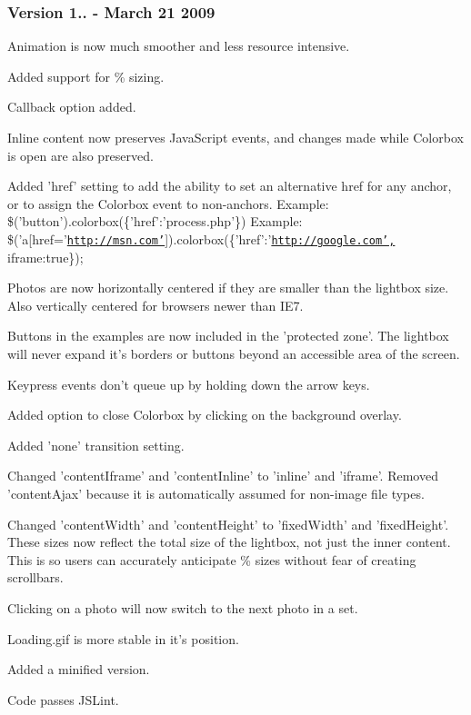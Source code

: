 \subsubsection*{Version 1.. -\/ March 21 2009}


\begin{DoxyItemize}
\item Animation is now much smoother and less resource intensive.
\item Added support for \% sizing.
\item Callback option added.
\item Inline content now preserves Java\-Script events, and changes made while Colorbox is open are also preserved.
\item Added 'href' setting to add the ability to set an alternative href for any anchor, or to assign the Colorbox event to non-\/anchors. Example\-: \$('button').colorbox(\{'href'\-:'process.\-php'\}) Example\-: \$('a\mbox{[}href='\href{http://msn.com'}{\tt http\-://msn.\-com'}\mbox{]}).colorbox(\{'href'\-:'\href{http://google.com',}{\tt http\-://google.\-com',} iframe\-:true\});
\item Photos are now horizontally centered if they are smaller than the lightbox size. Also vertically centered for browsers newer than I\-E7.
\item Buttons in the examples are now included in the 'protected zone'. The lightbox will never expand it's borders or buttons beyond an accessible area of the screen.
\item Keypress events don't queue up by holding down the arrow keys.
\item Added option to close Colorbox by clicking on the background overlay.
\item Added 'none' transition setting.
\item Changed 'content\-Iframe' and 'content\-Inline' to 'inline' and 'iframe'. Removed 'content\-Ajax' because it is automatically assumed for non-\/image file types.
\item Changed 'content\-Width' and 'content\-Height' to 'fixed\-Width' and 'fixed\-Height'. These sizes now reflect the total size of the lightbox, not just the inner content. This is so users can accurately anticipate \% sizes without fear of creating scrollbars.
\item Clicking on a photo will now switch to the next photo in a set.
\item Loading.\-gif is more stable in it's position.
\item Added a minified version.
\item Code passes J\-S\-Lint.
\end{DoxyItemize}

